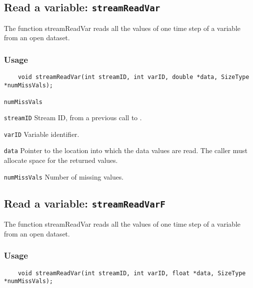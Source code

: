 

\subsection{Read a variable: \texttt{streamReadVar}}
\label{streamReadVar}

The function streamReadVar reads all the values of one time step of a variable
from an open dataset.
\subsubsection*{Usage}

\begin{verbatim}
    void streamReadVar(int streamID, int varID, double *data, SizeType *numMissVals);
\end{verbatim}

\hspace*{4mm}\begin{minipage}[]{15cm}
\begin{deflist}{\texttt{numMissVals}\ }
\item[\texttt{streamID}]
Stream ID, from a previous call to {}.
\item[\texttt{varID}]
Variable identifier.
\item[\texttt{data}]
Pointer to the location into which the data values are read.
                     The caller must allocate space for the returned values.
\item[\texttt{numMissVals}]
Number of missing values.

\end{deflist}
\end{minipage}


\subsection{Read a variable: \texttt{streamReadVarF}}
\label{streamReadVarF}

The function streamReadVar reads all the values of one time step of a variable
from an open dataset.
\subsubsection*{Usage}

\begin{verbatim}
    void streamReadVar(int streamID, int varID, float *data, SizeType *numMissVals);
\end{verbatim}

